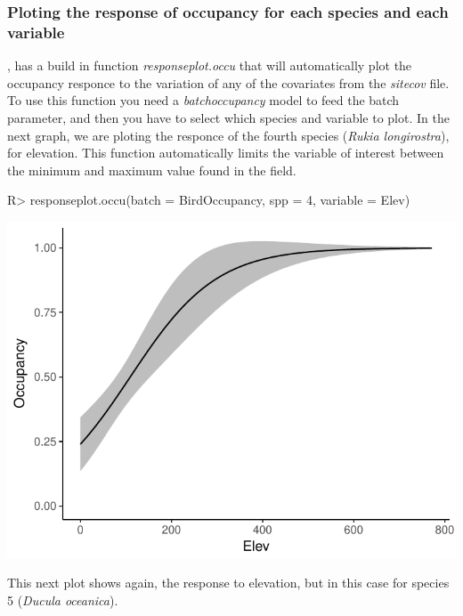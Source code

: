 \documentclass[article]{jss}
\begin{document}
\subsubsection{Ploting the response of occupancy for each species and
each
variable}\label{ploting-the-response-of-occupancy-for-each-species-and-each-variable}

, has a build in function
\emph{responseplot.occu} that will automatically plot the occupancy
responce to the variation of any of the covariates from the
\emph{sitecov} file. To use this function you need a
\emph{batchoccupancy} model to feed the batch parameter, and then you
have to select which species and variable to plot. In the next graph, we
are ploting the responce of the fourth species (\emph{Rukia
longirostra}), for elevation. This function automatically limits the
variable of interest between the minimum and maximum value found in the
field.

\begin{CodeChunk}

\begin{CodeInput}
R> responseplot.occu(batch = BirdOccupancy, spp = 4, variable = Elev)
\end{CodeInput}


\begin{center}\includegraphics{diversityocc_files/figure-latex/unnamed-chunk-13-1} \end{center}

\end{CodeChunk}

This next plot shows again, the response to elevation, but in this case
for species 5 (\emph{Ducula oceanica}).
\end{document}
